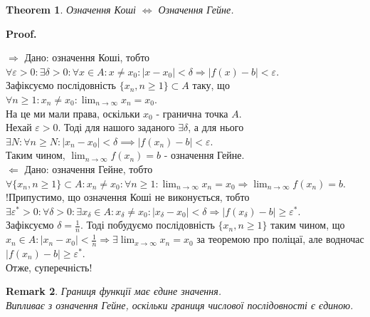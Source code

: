 \documentclass[a4paper, 14pt]{article}
\makeatletter
\def\huge{\displaystyle}
\def\qed{$\blacksquare$}
\def\rightproof{$\boxed{\Rightarrow}$ }
\def\leftproof{$\boxed{\Leftarrow}$ }
\theoremstyle{theoremdd}
\newtheorem{theorem}{Theorem}[subsection]
\theoremstyle{theoremdd}
\theoremstyle{theoremdd}
\theoremstyle{theoremdd}
\theoremstyle{theoremdd}
\theoremstyle{theoremdd}
\newtheorem{remark}[theorem]{Remark}
\theoremstyle{theoremdd}
\theoremstyle{theoremdd}
\renewenvironment{proof}[1][Proof.\\]{\par
\pushQED{\hfill \qed}%
\normalfont \topsep6\p@\@plus6\p@\relax
\trivlist
\item\relax
{\bfseries
#1\@addpunct{.}}\hspace\labelsep\ignorespaces
}{%
\popQED\endtrivlist\@endpefalse
}
\makeatother
\begin{document}
	\begin{theorem}
	Означення Коші $\iff$ Означення Гейне.
	\end{theorem}
	
	\begin{proof}
	\rightproof Дано: означення Коші, тобто\\
	$\forall \varepsilon > 0: \exists \delta > 0: \forall x \in A: x \neq x_0: |x-x_0|<\delta \Rightarrow |f(x)-b|<\varepsilon$.\\
	Зафіксуємо послідовність $\{x_n, n \geq 1\} \subset A$ таку, що $\forall n \geq 1: x_n \neq x_0: \huge \lim_{n \to \infty} x_n = x_0$.\\
	На це ми мали права, оскільки $x_0$ - гранична точка $A$.\\
	Нехай $\varepsilon > 0$. Тоді для нашого заданого $\exists \delta$, а для нього $\exists N: \forall n \geq N: |x_n - x_0| < \delta \implies |f(x_n) - b| < \varepsilon$.\\
	Таким чином, $\huge \lim_{n \to \infty} f(x_n) = b$ - означення Гейне.
	\bigskip \\
	\leftproof Дано: означення Гейне, тобто\\
	$\huge \forall \{x_n, n \geq 1\}\subset A: x_n \neq x_0: \forall n \geq 1: \lim_{n \to \infty} x_n = x_0 \Rightarrow \lim_{n \to \infty} f(x_n) = b$.\\
	!Припустимо, що означення Коші не виконується, тобто\\
	$\exists \varepsilon^*>0: \forall \delta > 0: \exists x_{\delta} \in A: x_{\delta} \neq x_{0}: |x_{\delta} - x_0| < \delta \Rightarrow |f(x_{\delta}) - b| \geq \varepsilon^*$.\\
	Зафіксуємо $\delta = \huge \frac{1}{n}$. Тоді побудуємо послідовність $\{x_n, n \geq 1\}$ таким чином, що \\ $x_n \in A: |x_n-x_0| < \huge \frac{1}{n} \Rightarrow \exists \lim_{x \to \infty} x_n = x_0$ за теоремою про поліцаї, але водночас $|f(x_n) - b| \geq \varepsilon^*$.\\
	Отже, суперечність!
	\end{proof}
	
	\begin{remark}
	Границя функції має єдине значення.\\
	\textit{Випливає з означення Гейне, оскільки границя числової послідовності є єдиною.}
	\end{remark}
	
\end{document}
